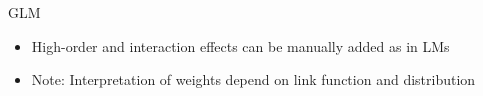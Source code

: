 \documentclass[10pt,compress,t,notes=noshow, xcolor=table]{beamer}
\begin{document}
\begin{frame}{GLM }
\begin{itemize}
        \item High-order and interaction effects can be manually added as in LMs
        \item Note: Interpretation of weights depend on link function and distribution
    \end{itemize}
\end{frame}
 	
\end{document}
